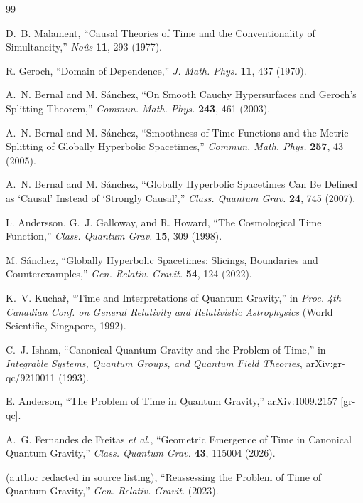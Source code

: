 \documentclass[11pt]{article}
\begin{document}
\begin{thebibliography}{99}

 D.~B. Malament, ``Causal Theories of Time and the Conventionality of Simultaneity,'' \textit{No\^us} \textbf{11}, 293 (1977).

 R. Geroch, ``Domain of Dependence,'' \textit{J. Math. Phys.} \textbf{11}, 437 (1970).

 A.~N. Bernal and M. S\'anchez, ``On Smooth Cauchy Hypersurfaces and Geroch's Splitting Theorem,'' \textit{Commun. Math. Phys.} \textbf{243}, 461 (2003).

 A.~N. Bernal and M. S\'anchez, ``Smoothness of Time Functions and the Metric Splitting of Globally Hyperbolic Spacetimes,'' \textit{Commun. Math. Phys.} \textbf{257}, 43 (2005).

 A.~N. Bernal and M. S\'anchez, ``Globally Hyperbolic Spacetimes Can Be Defined as `Causal' Instead of `Strongly Causal','' \textit{Class. Quantum Grav.} \textbf{24}, 745 (2007).

 L. Andersson, G.~J. Galloway, and R. Howard, ``The Cosmological Time Function,'' \textit{Class. Quantum Grav.} \textbf{15}, 309 (1998).

 M. S\'anchez, ``Globally Hyperbolic Spacetimes: Slicings, Boundaries and Counterexamples,'' \textit{Gen. Relativ. Gravit.} \textbf{54}, 124 (2022).

 K.~V. Kucha\v{r}, ``Time and Interpretations of Quantum Gravity,'' in \textit{Proc. 4th Canadian Conf. on General Relativity and Relativistic Astrophysics} (World Scientific, Singapore, 1992).

 C.~J. Isham, ``Canonical Quantum Gravity and the Problem of Time,'' in \textit{Integrable Systems, Quantum Groups, and Quantum Field Theories}, arXiv:gr-qc/9210011 (1993).

 E. Anderson, ``The Problem of Time in Quantum Gravity,'' arXiv:1009.2157 [gr-qc].

 A.~G. Fernandes de Freitas \textit{et al.}, ``Geometric Emergence of Time in Canonical Quantum Gravity,'' \textit{Class. Quantum Grav.} \textbf{43}, 115004 (2026).

 (author redacted in source listing), ``Reassessing the Problem of Time of Quantum Gravity,'' \textit{Gen. Relativ. Gravit.} (2023).


\end{thebibliography}
\end{document}
